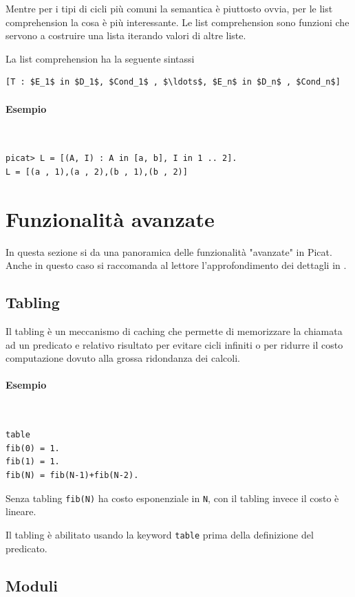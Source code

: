 \documentclass[12pt,a4paper,openright]{book} %
\begin{document}
Mentre per i tipi di cicli più comuni la semantica è piuttosto ovvia, per le list comprehension la cosa è più interessante. Le list comprehension sono funzioni che servono a costruire una lista iterando valori di altre liste.

La list comprehension ha la seguente sintassi
\begin{lstlisting}
[T : $E_1$ in $D_1$, $Cond_1$ , $\ldots$, $E_n$ in $D_n$ , $Cond_n$]
\end{lstlisting}

\paragraph{Esempio}\
\begin{lstlisting}
picat> L = [(A, I) : A in [a, b], I in 1 .. 2].
L = [(a , 1),(a , 2),(b , 1),(b , 2)]
\end{lstlisting}

\section{Funzionalità avanzate}
\label{sec:picat_advanced}

In questa sezione si da una panoramica delle funzionalità "avanzate" in Picat. Anche in questo caso si raccomanda al lettore l'approfondimento dei dettagli in \cite{PicatGuide}.

\subsection{Tabling}
\label{sec:picat_advanced_tabling}

Il tabling è un meccanismo di caching che permette di memorizzare la chiamata ad un predicato e relativo risultato per evitare cicli infiniti o per ridurre il costo computazione dovuto alla grossa ridondanza dei calcoli.

\paragraph{Esempio}\
\begin{lstlisting}
table
fib(0) = 1.
fib(1) = 1.
fib(N) = fib(N-1)+fib(N-2).
\end{lstlisting}
Senza tabling \verb|fib(N)| ha costo esponenziale in \verb|N|, con il tabling invece il costo è lineare.

Il tabling è abilitato usando la keyword \verb|table| prima della definizione del predicato.

\subsection{Moduli}
\label{sec:picat_advanced_modules}
\end{document}
